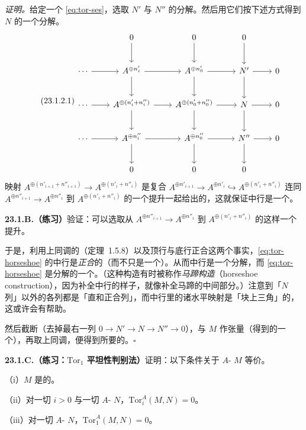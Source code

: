 \emph{证明。}\quad 给定一个\trShortExactSequence{} \eqref{eq:tor-ses}，选取 $N'$ 与 $N''$ 的分解。然后用它们按下述方式得到 $N$ 的一个分解。
\begin{equation*}\tag{23.1.2.1}\label{eq:tor-horseshoe}
\begin{tikzcd}[row sep=2.4em, column sep=2.2em]
 & 0 \ar[d] & 0 \ar[d] & 0 \ar[d] & \\
\cdots \ar[r] & A^{\oplus n'_i} \ar[r] \ar[d] & A^{\oplus n'_0} \ar[r] \ar[d] & N' \ar[r] \ar[d] & 0 \\
\cdots \ar[r] & A^{\oplus(n'_i+n''_i)} \ar[r] \ar[d] & A^{\oplus(n'_0+n''_0)} \ar[r] \ar[d] & N \ar[r] \ar[d] & 0 \\
\cdots \ar[r] & A^{\oplus n''_i} \ar[r] \ar[d] & A^{\oplus n''_0} \ar[r] \ar[d] & N'' \ar[r] \ar[d] & 0 \\
 & 0 & 0 & 0 &
\end{tikzcd}
\end{equation*}
映射 $A^{\oplus(n'_{i+1}+n''_{i+1})}\to A^{\oplus(n'_i+n''_i)}$ 是复合 $A^{\oplus n'_{i+1}}\to A^{\oplus n'_i}\hookrightarrow A^{\oplus(n'_i+n''_i)}$ 连同 $A^{\oplus n''_{i+1}}\to A^{\oplus n''_i}$ 到 $A^{\oplus(n'_i+n''_i)}$ 的一个提升一起给出的，这就保证中行是一个\trComplexN。

\textbf{23.1.B.（练习）}\quad 验证：可以选取从 $A^{\oplus n''_{i+1}}\to A^{\oplus n''_i}$ 到 $A^{\oplus(n'_i+n''_i)}$ 的这样一个提升。

于是，利用上同调的\trLongExactSequence（\mbox{定理~1.5.8}）以及顶行与底行正合这两个事实，\eqref{eq:tor-horseshoe} 的中行是\emph{正合}的（而不只是一个\trComplexN）。从而中行是一个分解，而 \eqref{eq:tor-horseshoe} 是分解的一个\trShortExactSequence。（这种构造有时被称作\emph{马蹄构造}（horseshoe construction），因为补全中行的样子，就像补全马蹄的中间部分。）注意到「$N$ 列」以外的各列都是「直和正合列」，而中行里的诸水平映射是「块上三角」的，这或许会有帮助。

然后截断（去掉最右一列 $0\to N'\to N\to N''\to 0$），与 $M$ 作张量（得到\trComplexes{}的一个\trShortExactSequence），再取上同调，便得到所要的\trLongExactSequence。\hfill$\square$

\textbf{23.1.C.（练习：$\mathrm{Tor}_1$ 平坦性判别法）}\quad 证明：以下条件关于 $A$-\trModule{} $M$ 等价。

（i）$M$ 是\trFlat{}的。

（ii）对一切 $i>0$ 与一切 $A$-\trModule{} $N$，$\mathrm{Tor}^A_i(M,N)=0$。

（iii）对一切 $A$-\trModule{} $N$，$\mathrm{Tor}^A_1(M,N)=0$。

